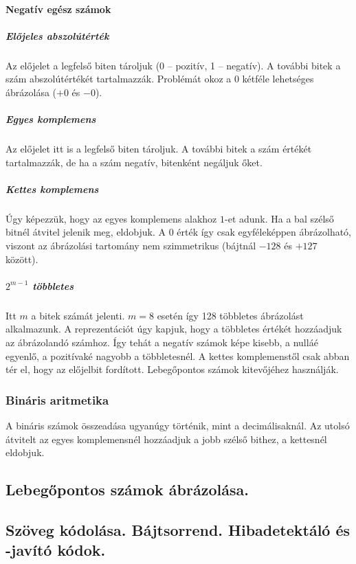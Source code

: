 \documentclass[a4paper]{article}
\begin{document}
\paragraph{Negatív egész számok}

\subparagraph{Előjeles abszolútérték} Az előjelet a legfelső biten tároljuk (0 -- pozitív, 1 -- negatív). A további bitek a szám abszolútértékét tartalmazzák. Problémát okoz a 0 kétféle lehetséges ábrázolása ($+0$ és $-0$).

\subparagraph{Egyes komplemens} Az előjelet itt is a legfelső biten tároljuk. A további bitek a szám értékét tartalmazzák, de ha a szám negatív, bitenként negáljuk őket.

\subparagraph{Kettes komplemens} Úgy képezzük, hogy az egyes komplemens alakhoz $1$-et adunk. Ha a bal szélső bitnél átvitel jelenik meg, eldobjuk. A $0$ érték így csak egyféleképpen ábrázolható, viszont az ábrázolási tartomány nem szimmetrikus (bájtnál $-128$ és $+127$ között).

\subparagraph{$2^{m-1}$ többletes} Itt $m$ a bitek számát jelenti. $m=8$ esetén így 128 többletes ábrázolást alkalmazunk. A reprezentációt úgy kapjuk, hogy a többletes értékét hozzáadjuk az ábrázolandó számhoz. Így tehát a negatív számok képe kisebb, a nulláé egyenlő, a pozitívaké nagyobb a többletesnél. A kettes komplemenstől csak abban tér el, hogy az előjelbit fordított. Lebegőpontos számok kitevőjéhez használják.

\subsubsection{Bináris aritmetika}

A bináris számok összeadása ugyanúgy történik, mint a decimálisaknál. Az utolsó átvitelt az egyes komplemensnél hozzáadjuk a jobb szélső bithez, a kettesnél eldobjuk.

\subsection{Lebegőpontos számok ábrázolása.}

\subsection{Szöveg kódolása. Bájtsorrend. Hibadetektáló és -javító kódok.}
\end{document}
